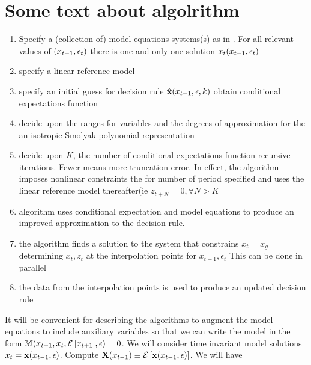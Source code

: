 \documentclass[12pt]{article}
\begin{document}





\newpage
\section{Some text about algolrithm}

\begin{enumerate}
\item Specify a (collection of) model equations systems(s) 
as in .
For all relevant values of $(x_{t-1},\epsilon_t)$ there is one and only one solution $x_t(x_{t-1},\epsilon_t)$
\item specify a linear reference model
\item specify an initial guess for decision rule $\hat{\mathbf{x}}(x_{t-1},\epsilon,k)$ obtain conditional expectations function
\item decide upon the ranges for variables and the degrees of approximation for the an-isotropic Smolyak polynomial representation
\item decide upon $K$, the number of conditional expectations function recursive iterations.  Fewer means more truncation error. In effect, 
the algorithm imposes nonlinear constraints the for number of period specified 
and uses the linear reference model thereafter(ie $z_{t+N}=0, \forall N>K$
\item algorithm uses conditional expectation and model equations to produce an improved approximation to the decision rule.
\item the algorithm finds a solution to the system that constrains $x_t= x_g$ determining $x_t,z_t$ at the interpolation points for $x_{t-1},\epsilon_t$  This can be done in parallel
\item the data from the interpolation points is used to produce an updated decision rule
\end{enumerate}



It will be convenient for describing the algorithms to
 augment the model equations to include auxiliary variables so that we can write the model in the form
$  \mathbb{M}(x_{t-1},x_t,{\mathcal{E}\left [ x_{t+1} \right ]},\epsilon)=0$.  We will consider time invariant model solutions $x_t=\mathbf{x}(x_{t-1},\epsilon)$.  Compute $\mathbf{X}(x_{t-1})\equiv {\mathcal{E}\left [  \mathbf{x}(x_{t-1},\epsilon)\right ]}$. We will have
\end{document}

